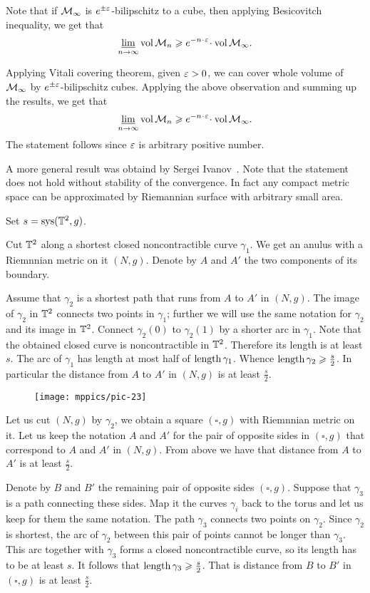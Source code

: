 Note that if $\mathcal{M}_\infty$ is $e^{\pm\varepsilon}$-bilipschitz to a cube, then applying Besicovitch inequality, we get that 
\[\liminf_{n\to\infty} \vol \spc{M}_n\ge e^{-n\cdot \eps}\cdot\vol \spc{M}_\infty.\]

Applying Vitali covering theorem, given $\varepsilon>0$, we can cover whole volume of $\mathcal{M}_\infty$ by $e^{\pm\varepsilon}$-bilipschitz cubes.
Applying the above observation and summing up the results, we get that 
\[\liminf_{n\to\infty} \vol \spc{M}_n\ge e^{-n\cdot \eps}\cdot\vol \spc{M}_\infty.\]
The statement follows since $\varepsilon$ is arbitrary positive number.

 A more general result was obtaind by Sergei Ivanov~\cite{ivanov-1997}.
Note that the statement does not hold without stability of the convergence. In fact any compact metric space can be approximated by Riemannian surface with arbitrary small area.

Set $s=\mathop{\rm sys}\nolimits(\mathbb{T}^2,g)$.

Cut $\mathbb{T}^2$ along a shortest closed noncontractible curve $\gamma_1$.
We get an anulus with a Riemnnian metric on it $(N,g)$.
Denote by $A$ and $A'$ the two components of its boundary.

Assume that $\gamma_2$ is a shortest path that runs from $A$ to $A'$ in $(N,g)$.
The image of $\gamma_2$ in $\mathbb{T}^2$ connects two points in $\gamma_1$;
further we will use the same notation for $\gamma_2$ and its image in $\mathbb{T}^2$.
Connect $\gamma_2(0)$ to $\gamma_2(1)$ by a shorter arc in $\gamma_1$.
Note that the obtained closed curve is noncontractible in $\mathbb{T}^2$.
Therefore its length is at least $s$.
The arc of $\gamma_1$ has length at most half of $\mathop{\rm length}\nolimits\gamma_1$.
Whence $\mathop{\rm length}\nolimits \gamma_2\geqslant \tfrac s2$.
In particular the distance from $A$ to $A'$ in $(N,g)$ is at least $\tfrac s2$.

\begin{wrapfigure}{r}{45 mm}
\vskip-4mm
\centering
\texttt{[image: mppics/pic-23]}
\end{wrapfigure}

Let us cut $(N,g)$ by $\gamma_2$, we obtain a square $(\square,g)$ with Riemnnian metric on it.
Let us keep the notation $A$ and $A'$ for the pair of opposite sides in $(\square,g)$ that correspond to $A$ and $A'$ in $(N,g)$.
From above we have that distance from $A$ to $A'$ is at least $\tfrac s2$.

Denote by $B$ and $B'$ the remaining pair of opposite sides $(\square,g)$.
Suppose that $\gamma_3$ is a path connecting these sides.
Map it the curves $\gamma_i$ back to the torus and let us keep for them the same notation.
The path $\gamma_3$ connects two points on $\gamma_2$.
Since $\gamma_2$ is shortest, the arc of $\gamma_2$ between this pair of points cannot be longer than $\gamma_3$.
This arc together with $\gamma_3$ forms a closed noncontractible curve, so its length has to be at least $s$.
It follows that $\mathop{\rm length}\nolimits\gamma_3\geqslant \tfrac s2$.
That is distance from $B$ to $B'$ in  $(\square,g)$ is at least $\tfrac s2$.


